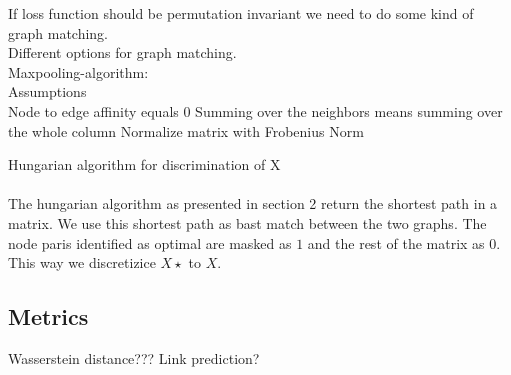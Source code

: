 If loss function should be permutation invariant we need to do some kind of graph matching.\\
Different options for graph matching.\\
Maxpooling-algorithm:\\
Assumptions\\
Node to edge affinity equals 0
Summing over the neighbors means summing over the whole column
Normalize matrix with Frobenius Norm


Hungarian algorithm for discrimination of X \\
\\
The hungarian algorithm as presented in section 2 return the shortest path in a matrix. We use this shortest path as bast match between the two graphs. The node paris identified as optimal are masked as $1$ and the rest of the matrix as $0$. This way we discretizice $X\star$ to $X$. 

\subsection{Metrics}

Wasserstein distance???
Link prediction?

